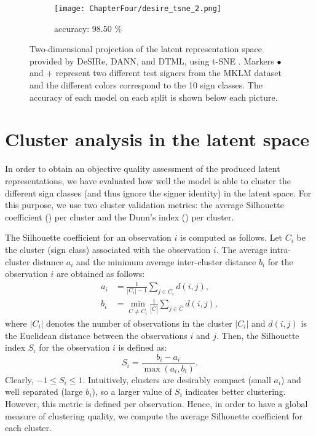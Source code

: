 \begin{figure}[ht!]
\begin{minipage}[t!]{0.985\textwidth}
\begin{subfigure}{0.325\textwidth}
            \centering
            \texttt{[image: ChapterFour/desire\_tsne\_2.png]}
            \caption{accuracy: 98.50 \%}
        \end{subfigure}
    \end{minipage}
    \caption{Two-dimensional projection of the latent representation space provided by DeSIRe, DANN, and DTML, using t-SNE \cite{Maaten2008}. Markers $\bullet$ and $\textbf{+}$ represent two different test signers from the MKLM dataset and the different colors correspond to the 10 sign classes. The accuracy of each model on each split is shown below each picture.}
    \label{fig:desire_tsne_b}
\end{figure}

\section{Cluster analysis in the latent space}
\label{sec:desire_clusters}
In order to obtain an objective quality assessment of the produced latent representations, we have evaluated how well the model is able to cluster the different sign classes (and thus ignore the signer identity) in the latent space. For this purpose, we use two cluster validation metrics: the average Silhouette coefficient (\citet{Rousseeuw1987}) per cluster and the Dunn's index (\citet{Dunn1973}) per cluster.

The Silhouette coefficient for an observation $i$ is computed as follows. Let $C_i$ be the cluster (sign class) associated with the observation $i$. The average intra-cluster distance $a_i$ and the minimum average inter-cluster distance $b_i$ for the observation $i$ are obtained as follows:
\begin{align}
    a_i &= \frac{1}{|C_i|-1} \sum_{j \in C_i} d(i,j),\\
    b_i &= \min_{\overline{C} \neq C_i} \frac{1}{|\overline{C}|} \sum_{j \in \overline{C}} d(i,j),
\end{align}
where $|C_i|$ denotes the number of observations in the cluster $|C_i|$ and $d(i,j)$ is the Euclidean distance between the observations $i$ and $j$. Then, the Silhouette index $S_i$ for the observation $i$ is defined as:
\begin{equation}
    S_i = \frac{b_i - a_i}{\max(a_i, b_i)}.
\end{equation}
Clearly, $-1 \leq S_i \leq 1$. Intuitively, clusters are desirably compact (small $a_i$) and well separated (large $b_i$), so a larger value of $S_i$ indicates better clustering. However, this metric is defined per observation. Hence, in order to have a global measure of clustering quality, we compute the average Silhouette coefficient for each cluster.


